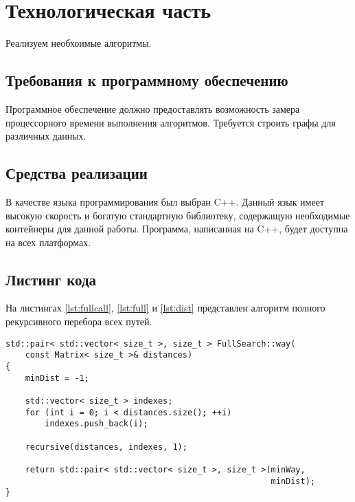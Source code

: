\newpage
\section{Технологическая часть}

Реализуем необхоимые алгоритмы.

\subsection{Требования к программному обеспечению}

Программное обеспечение должно предоставлять возможность замера процессорного времени выполнения алгоритмов.
Требуется строить графы для различных данных.

\subsection{Средства реализации}

В качестве языка программирования был выбран {\ttfamily C++}.
Данный язык имеет высокую скорость и богатую стандартную библиотеку,
содержащую необходимые контейнеры для данной работы. Программа, написанная на
{\ttfamily C++}, будет доступна на всех платформах.

\subsection{Листинг кода}

На листингах \ref{lst:fullcall}, \ref{lst:full} и \ref{lst:dist} представлен алгоритм полного рекурсивного
перебора всех путей.

\begin{lstlisting}[caption=Вызов алгоритма рекурсивного перебора,label=lst:fullcall]
std::pair< std::vector< size_t >, size_t > FullSearch::way(
    const Matrix< size_t >& distances)
{
    minDist = -1;

    std::vector< size_t > indexes;
    for (int i = 0; i < distances.size(); ++i)
        indexes.push_back(i);

    recursive(distances, indexes, 1);

    return std::pair< std::vector< size_t >, size_t >(minWay,
                                                      minDist);
}
\end{lstlisting}

